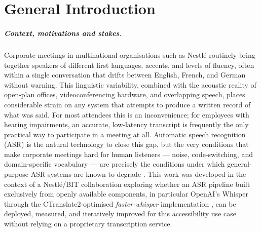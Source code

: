 \documentclass[12pt]{report}
\begin{document}
\setcounter{page}{6}
\newpage
{}
\setcounter{page}{7}
\thispagestyle{fancy}

\newpage
\listoffigures
\thispagestyle{fancy}
\newpage
\listoftables
\thispagestyle{fancy}

\newpage
{}
\chapter*{General Introduction}
\thispagestyle{fancy}
\setcounter{page}{1}

\paragraph{Context, motivations and stakes.}
Corporate meetings in multinational organisations such as Nestlé routinely bring together speakers of different first languages, accents, and levels of fluency, often within a single conversation that drifts between English, French, and German without warning. This linguistic variability, combined with the acoustic reality of open-plan offices, videoconferencing hardware, and overlapping speech, places considerable strain on any system that attempts to produce a written record of what was said. For most attendees this is an inconvenience; for employees with hearing impairments, an accurate, low-latency transcript is frequently the only practical way to participate in a meeting at all. Automatic speech recognition (ASR) is the natural technology to close this gap, but the very conditions that make corporate meetings hard for human listeners --- noise, code-switching, and domain-specific vocabulary --- are precisely the conditions under which general-purpose ASR systems are known to degrade \cite{radford2023robust,baevski2020wav2vec}. This work was developed in the context of a Nestlé/BIT collaboration exploring whether an ASR pipeline built exclusively from openly available components, in particular OpenAI's Whisper through the CTranslate2-optimised \textit{faster-whisper} implementation \cite{fasterwhisper2023}, can be deployed, measured, and iteratively improved for this accessibility use case without relying on a proprietary transcription service.
\end{document}
